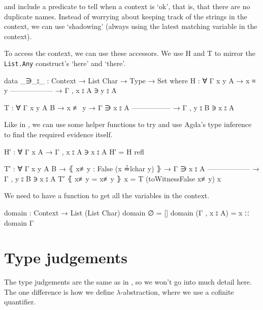 \citet{aydemir_engineering_2008} and \citet{chargueraud_locally_2012} include a predicate to tell
when a context is `ok', that is, that there are no duplicate names. Instead of worrying about
keeping track of the strings in the context, we can use `shadowing' (always using the latest
matching variable in the context).

To access the context, we can use these accessors. We use H and T to mirror the \texttt{List.Any}
construct's `here' and `there'.
\begin{code}
  data _∋_⦂_ : Context → List Char → Type → Set where
    H : ∀ {Γ x y A}
      → x ≡ y
        ------------------
      → Γ , x ⦂ A ∋ y ⦂ A

    T : ∀ {Γ x y A B}
      → x ≢ y
      → Γ ∋ x ⦂ A
        -----------------
      → Γ , y ⦂ B ∋ x ⦂ A
\end{code}

Like in \citet{wadler_programming_2022}, we can use some helper functions to try and use Agda's type
inference to find the required evidence itself.
\begin{code}
  H′ : ∀ {Γ x A}
    → Γ , x ⦂ A ∋ x ⦂ A
  H′ = H refl

  T′ : ∀ {Γ x y A B}
    → ⦃ x≢y : False (x ≟lchar y) ⦄
    → Γ ∋ x ⦂ A
      ------------------
    → Γ , y ⦂ B ∋ x ⦂ A
  T′ ⦃ x≢y = x≢y ⦄ x = T (toWitnessFalse x≢y) x
\end{code}

We need to have a function to get all the variables in the context.
\begin{code}
  domain : Context → List (List Char)
  domain ∅ = []
  domain (Γ , x ⦂ A) = x ∷ domain Γ
\end{code}

\section{Type judgements}
\label{appendix:type_judgements}
The type judgements are the same as in
\citet[chapter~Lambda]{wadler_programming_2022}, so we won't go into much detail here. The one
difference is how we define $\lambda$-abstraction, where we use a cofinite quantifier.

